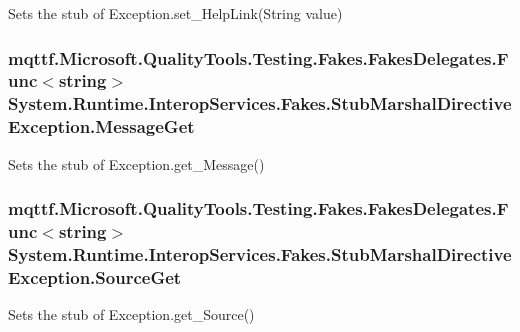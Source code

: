 Sets the stub of Exception.\-set\-\_\-\-Help\-Link(\-String value)

\hypertarget{class_system_1_1_runtime_1_1_interop_services_1_1_fakes_1_1_stub_marshal_directive_exception_aebc8f67c61448e52890fa047d5bdad57}{
\subsubsection[{Message\-Get}]{\setlength{\rightskip}{0pt plus 5cm}mqttf.\-Microsoft.\-Quality\-Tools.\-Testing.\-Fakes.\-Fakes\-Delegates.\-Func$<$string$>$ System.\-Runtime.\-Interop\-Services.\-Fakes.\-Stub\-Marshal\-Directive\-Exception.\-Message\-Get}}\label{class_system_1_1_runtime_1_1_interop_services_1_1_fakes_1_1_stub_marshal_directive_exception_aebc8f67c61448e52890fa047d5bdad57}


Sets the stub of Exception.\-get\-\_\-\-Message()

\hypertarget{class_system_1_1_runtime_1_1_interop_services_1_1_fakes_1_1_stub_marshal_directive_exception_a7168b5a2ae5f7d40b353fc6fef46423a}{
\subsubsection[{Source\-Get}]{\setlength{\rightskip}{0pt plus 5cm}mqttf.\-Microsoft.\-Quality\-Tools.\-Testing.\-Fakes.\-Fakes\-Delegates.\-Func$<$string$>$ System.\-Runtime.\-Interop\-Services.\-Fakes.\-Stub\-Marshal\-Directive\-Exception.\-Source\-Get}}\label{class_system_1_1_runtime_1_1_interop_services_1_1_fakes_1_1_stub_marshal_directive_exception_a7168b5a2ae5f7d40b353fc6fef46423a}


Sets the stub of Exception.\-get\-\_\-\-Source()

